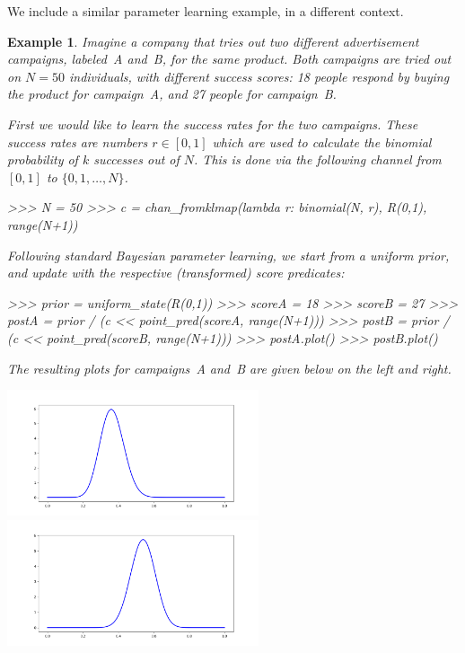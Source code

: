 \documentclass[leqno]{tufte-book} %
\newtheorem{example}[theorem]{Example}
\begin{document}
We include a similar parameter learning example, in a different
context.

%

\begin{example}
\label{ex:advertisement}
Imagine a company that tries out two different advertisement
campaigns, labeled~A and~B, for the same product. Both campaigns are
tried out on $N=50$ individuals, with different success scores: 18
people respond by buying the product for campaign~A, and 27 people for
campaign~B.

First we would like to learn the success rates for the two campaigns.
These success rates are numbers $r\in[0,1]$ which are used to
calculate the binomial probability of $k$ successes out of $N$.  This
is done via the following channel from $[0,1]$ to $\{0,1,\ldots, N\}$.
\begin{python}
>>> N = 50
>>> c = chan_fromklmap(lambda r: binomial(N, r), R(0,1), range(N+1))
\end{python}

\noindent Following standard Bayesian parameter learning, we start
from a uniform prior, and update with the respective (transformed)
score predicates:
\begin{python}
>>> prior = uniform_state(R(0,1))
>>> scoreA = 18
>>> scoreB = 27
>>> postA = prior / (c << point_pred(scoreA, range(N+1)))
>>> postB = prior / (c << point_pred(scoreB, range(N+1)))
>>> postA.plot()
>>> postB.plot()
\end{python}

\noindent The resulting plots for campaigns~A and~B are given
below on the left and right.

\includegraphics[width=20em]{Pictures/advertisement_scoreA.png}
\includegraphics[width=20em]{Pictures/advertisement_scoreB.png}


\end{example}
\end{document}
